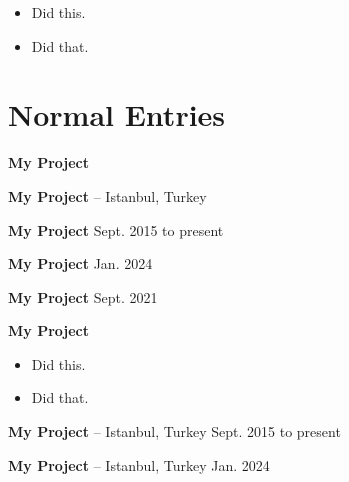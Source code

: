 \documentclass[10pt, letterpaper]{article}
\newenvironment{highlights}{
        \begin{itemize}[
                topsep=0pt,
                partopsep=0pt,
                itemsep=0pt,
                leftmargin=10pt
            ]
    }{
        \end{itemize}
    } %
\begin{document}
        \begin{highlights}
        \item Did this.
        \item Did that.
        \end{highlights}



    
    \section{Normal Entries}

        
        \textbf{My Project} \hfill 



        \vspace{8pt}

        \textbf{My Project} -- Istanbul, Turkey \hfill 



        \vspace{8pt}

        \textbf{My Project} \hfill Sept. 2015 to present



        \vspace{8pt}

        \textbf{My Project} \hfill Jan. 2024



        \vspace{8pt}

        \textbf{My Project} \hfill Sept. 2021



        \vspace{8pt}

        \textbf{My Project} \hfill 

        \begin{highlights}
        \item Did this.
        \item Did that.
        \end{highlights}


        \vspace{8pt}

        \textbf{My Project} -- Istanbul, Turkey \hfill Sept. 2015 to present



        \vspace{8pt}

        \textbf{My Project} -- Istanbul, Turkey \hfill Jan. 2024
\end{document}

